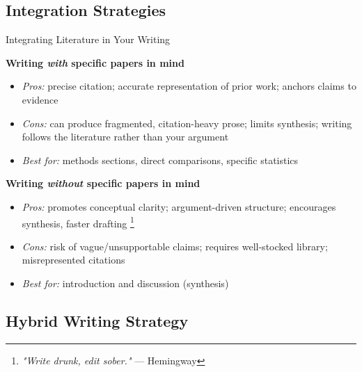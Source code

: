 \documentclass{beamer}
\begin{document}
\subsection{Integration Strategies}
\begin{frame}{Integrating Literature in Your Writing}

  \footnotesize

  \textbf{Writing \textit{with} specific papers in mind}
  \begin{itemize}
    \item \emph{Pros:} precise citation; accurate representation
      of prior work; anchors claims to evidence
    \item \emph{Cons:} can produce fragmented,
      citation-heavy prose; limits synthesis; writing
      follows the literature rather than your argument
    \item \emph{Best for:} methods sections, direct
      comparisons, specific statistics
  \end{itemize}

  \medskip
  \textbf{Writing \textit{without} specific papers in mind}
  \begin{itemize}
    \item \emph{Pros:} promotes conceptual clarity;
      argument-driven structure; encourages synthesis, faster drafting%
      {\scriptsize \footnote{\textit{"Write drunk, edit sober."} --- Hemingway}}
    \item \emph{Cons:} risk of vague/unsupportable claims;
      requires well-stocked library; misrepresented citations
    \item \emph{Best for:} introduction and discussion (synthesis)
  \end{itemize}

\end{frame}


\subsection{Hybrid Writing Strategy}
\end{document}
